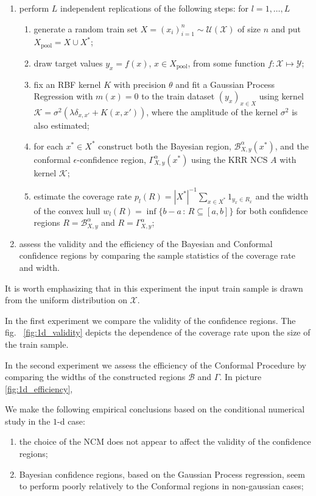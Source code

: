 \documentclass[a4paper,14pt]{extarticle}
\newcommand{\Bcal}{\mathcal{B}}
\newcommand{\Kcal}{\mathcal{K}}
\newcommand{\Xcal}{\mathcal{X}}
\newcommand{\Ycal}{\mathcal{Y}}
\begin{document}
\begin{enumerate}
  \item perform $L$ independent replications of the following steps: for $l=1,\ldots, L$
  \begin{enumerate}
    \item generate a random train set $X = (x_i)_{i=1}^n\sim \mathcal{U}(\Xcal)$ of
    size $n$ and put $X_{\text{pool}} = X \cup X^*$;
    \item draw target values $y_x = f(x)$, $x\in X_{\text{pool}}$, from some
    function $f:\Xcal \mapsto \Ycal$;
    \item fix an RBF kernel $K$ with precision $\theta$ and fit a Gaussian Process
    Regression with $m(x) = 0$ to the train dataset $(y_x)_{x\in X}$ using kernel
    $\Kcal = \sigma^2(\lambda \delta_{x,x'} + K(x,x'))$, where the amplitude of
    the kernel $\sigma^2$ is also estimated;
    \item for each $x^* \in X^*$ construct both the Bayesian region, $\Bcal_{X, y}^\alpha(x^*)$,
    and the conformal $\epsilon$-confidence region, $\Gamma_{X, y}^\alpha(x^*)$ using
    the KRR NCS $A$ with kernel $\Kcal$;
    \item estimate the coverage rate $p_l(R) = |X^*|^{-1}\sum_{x\in X^*} 1_{y_x\in R_x}$
    and the width of the convex hull $w_l(R) = \inf\{b-a\,:\,R \subseteq [a, b]\}$
    for both confidence regions $R=\Bcal_{X, y}^\alpha$ and $R=\Gamma_{X, y}^\alpha$;
  \end{enumerate}
  \item assess the validity and the efficiency of the Bayesian and Conformal confidence
  regions by comparing the sample statistics of the coverage rate and width.
\end{enumerate}
It is worth emphasizing that in this experiment the input train sample is drawn from
the uniform distribution on $\Xcal$.

In the first experiment we compare the validity of the confidence regions. The fig.~
\ref{fig:1d_validity} depicts the dependence of the coverage rate upon the size of the
train sample.

In the second experiment we assess the efficiency of the Conformal Procedure by
comparing the widths of the constructed regions $\Bcal$ and $\Gamma$. In picture
\ref{fig:1d_efficiency}, 

We make the following empirical conclusions based on the conditional numerical study
in the $1$-d case: \begin{enumerate}
  \item the choice of the NCM does not appear to affect the validity of the confidence
  regions;
  \item Bayesian confidence regions, based on the Gaussian Process regression, seem
  to perform poorly relatively to the Conformal regions in non-gaussian cases;
  
\end{enumerate}
\end{document}
